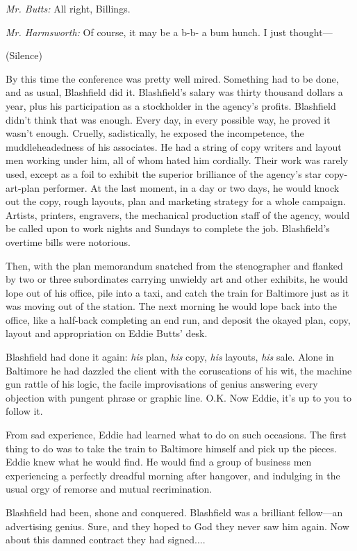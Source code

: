 \documentclass[twoside,nohyper,openany,nobib]{tufte-book}
\begin{document}
\emph{Mr. Butts:} All right, Billings.

\emph{Mr. Harmsworth:} Of course, it may be a b-b- a bum hunch. I just
thought---

(Silence)

By this time the conference was pretty well mired. Something had to be
done, and as usual, Blashfield did it. Blashfield's salary was thirty
thousand dollars a year, plus his participation as a stockholder in the
agency's profits. Blashfield didn't think that was enough. Every day, in
every possible way, he proved it wasn't enough. Cruelly, sadistically,
he exposed the incompetence, the muddleheadedness of his associates. He
had a string of copy writers and layout men working under him, all of
whom hated him cordially. Their work was rarely used, except as a foil
to exhibit the superior brilliance of the agency's star copy-art-plan
performer. At the last moment, in a day or two days, he would knock out
the copy, rough layouts, plan and marketing strategy for a whole
campaign. Artists, printers, engravers, the mechanical production staff
of the agency, would be called upon to work nights and Sundays to
complete the job. Blashfield's overtime bills were notorious.

Then, with the plan memorandum snatched from the stenographer and
flanked by two or three subordinates carrying unwieldy art and other
exhibits, he would lope out of his office, pile into a taxi, and catch
the train for Baltimore just as it was moving out of the station. The
next morning he would lope back into the office, like a half-back
completing an end run, and deposit the okayed plan, copy, layout and
appropriation on Eddie Butts' desk.

Blashfield had done it again: \emph{his} plan, \emph{his} copy,
\emph{his} layouts, \emph{his} sale. Alone in Baltimore he had dazzled
the client with the coruscations of his wit, the machine gun rattle of
his logic, the facile improvisations of genius answering every objection
with pungent phrase or graphic line. O.K. Now Eddie, it's up to you to
follow it.

From sad experience, Eddie had learned what to do on such occasions. The
first thing to do was to take the train to Baltimore himself and pick up
the pieces. Eddie knew what he would find. He would find a group of
business men experiencing a perfectly dreadful morning after hangover,
and indulging in the usual orgy of remorse and mutual recrimination.

Blashfield had been, shone and conquered. Blashfield was a brilliant
fellow---an advertising genius. Sure, and they hoped to God they never
saw him again. Now about this damned contract they had signed....
\end{document}
